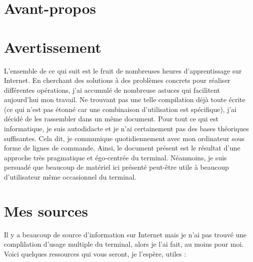 \section*{Avant-propos}

\section{Avertissement}\label{avertissement}

L'ensemble de ce qui suit est le fruit de nombreuses heures
d'apprentissage sur Internet. En cherchant des solutions à des problèmes
concrets pour réaliser différentes opérations, j'ai accumulé de
nombreuse astuces qui facilitent aujourd'hui mon travail. Ne trouvant
pas une telle compilation déjà toute écrite (ce qui n'est pas étonné car
une combinaison d'utilisation est spécifique), j'ai décidé de les
rassembler dans un même document. Pour tout ce qui est informatique, je
suis autodidacte et je n'ai certainement pas des bases théoriques
suffisantes. Cela dit, je communique quotidiennement avec mon ordinateur
sous forme de lignes de commande. Ainsi, le document présent est le
résultat d'une approche très pragmatique et égo-centrée du terminal.
Néanmoins, je suis persuadé que beaucoup de matériel ici présenté
peut-être utile à beaucoup d'utilisateur même occasionnel du terminal.

\section{Mes sources}\label{mes-sources}

Il y a beaucoup de source d'information sur Internet mais je n'ai pas
trouvé une complilation d'usage multiple du terminal, alors je l'ai
fait, au moins pour moi. Voici quelques ressources qui vous seront, je
l'espère, utiles :

